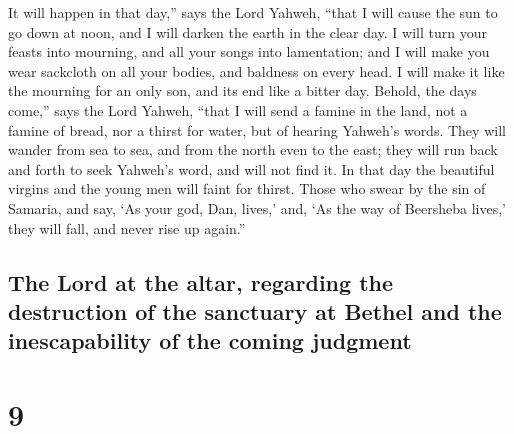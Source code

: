  It will happen in that day,'' says the Lord Yahweh,
``that I will cause the sun to go down at noon, and I will darken the
earth in the clear day.  I will turn your feasts into
mourning, and all your songs into lamentation; and I will make you wear
sackcloth on all your bodies, and baldness on every head. I will make it
like the mourning for an only son, and its end like a bitter day.
 Behold, the days come,'' says the Lord Yahweh, ``that I
will send a famine in the land, not a famine of bread, nor a thirst for
water, but of hearing Yahweh's words.  They will wander
from sea to sea, and from the north even to the east; they will run back
and forth to seek Yahweh's word, and will not find it. 
In that day the beautiful virgins and the young men will faint for
thirst.  Those who swear by the sin of Samaria, and say,
`As your god, Dan, lives,' and, `As the way of Beersheba lives,' they
will fall, and never rise up again.''

\hypertarget{the-lord-at-the-altar-regarding-the-destruction-of-the-sanctuary-at-bethel-and-the-inescapability-of-the-coming-judgment}{%
\subsection{The Lord at the altar, regarding the destruction of the
sanctuary at Bethel and the inescapability of the coming
judgment}\label{the-lord-at-the-altar-regarding-the-destruction-of-the-sanctuary-at-bethel-and-the-inescapability-of-the-coming-judgment}}

\hypertarget{section-8}{%
\section{9}\label{section-8}}

